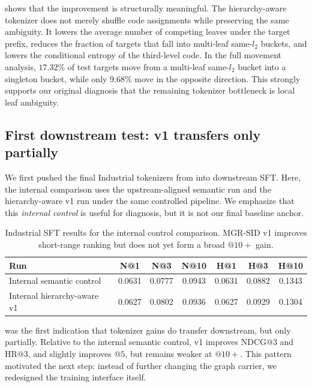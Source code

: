  shows that the improvement is structurally meaningful. The hierarchy-aware tokenizer does not merely shuffle code assignments while preserving the same ambiguity. It lowers the average number of competing leaves under the target prefix, reduces the fraction of targets that fall into multi-leaf same-$l_2$ buckets, and lowers the conditional entropy of the third-level code. In the full movement analysis, $17.32\%$ of test targets move from a multi-leaf same-$l_2$ bucket into a singleton bucket, while only $9.68\%$ move in the opposite direction. This strongly supports our original diagnosis that the remaining tokenizer bottleneck is local leaf ambiguity.

\subsection{First downstream test: v1 transfers only partially}

We first pushed the final Industrial tokenizers from  into downstream SFT. Here, the internal comparison uses the upstream-aligned semantic run and the hierarchy-aware v1 run under the same controlled pipeline. We emphasize that this \emph{internal control} is useful for diagnosis, but it is not our final baseline anchor.

\begin{table}[t]
  \centering
  \caption{Industrial SFT results for the internal control comparison. MGR-SID v1 improves short-range ranking but does not yet form a broad $@10+$ gain.}
  \label{tab:sft_v1}
  \begin{tabular}{lcccccc}
    \toprule
    Run & N@1 & N@3 & N@10 & H@1 & H@3 & H@10 \\
    \midrule
    Internal semantic control & 0.0631 & 0.0777 & 0.0943 & 0.0631 & 0.0882 & 0.1343 \\
    Internal hierarchy-aware v1 & 0.0627 & 0.0802 & 0.0936 & 0.0627 & 0.0929 & 0.1304 \\
    \bottomrule
  \end{tabular}
\end{table}

 was the first indication that tokenizer gains do transfer downstream, but only partially. Relative to the internal semantic control, v1 improves $\mathrm{NDCG}@3$ and $\mathrm{HR}@3$, and slightly improves $@5$, but remains weaker at $@10+$. This pattern motivated the next step: instead of further changing the graph carrier, we redesigned the training interface itself.

